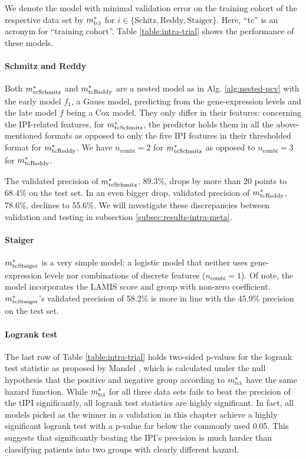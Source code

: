 We denote the model with minimal validation error on the training cohort of the respective data set 
by $m^*_\text{tci}$ for $i \in \{\text{Schitz}, \text{Reddy}, \text{Staiger}\}$.  Here, ``tc'' is an 
acronym for ``training cohort''. Table \ref{table:intra-trial} shows the performance of these models.

\paragraph{Schmitz and Reddy}
Both $m^*_\text{tcSchmitz}$ and $m^*_\text{tcReddy}$ are a nested 
model as in Alg. \ref{alg:nested-pcv} with the early model $f_1$, a Gauss model, predicting from 
the gene-expression levels and the late model $f$ being a Cox model. They only differ in their 
features: concerning the IPI-related features, for $m^*_\text{tcSchmitz}$, the predictor holds them in
all the above-mentioned formats as opposed to only the five IPI features in their thresholded 
format for 
$m^*_\text{tcReddy}$. We have $n_\text{combi} = 2$ for $m^*_\text{tcSchmitz}$ as opposed to $n_\text{combi} = 3$ 
for $m^*_\text{tcReddy}$.

The validated precision of $m^*_\text{tcSchmitz}$, \num{89.3}\%, drops by more than \num{20} points 
to \num{68.4}\% on the test set. In an even bigger drop, validated precision of $m^*_\text{tcReddy}$,
\num{78.6}\%, declines to \num{55.6}\%. We will investigate these discrepancies between 
validation and testing in subsection \ref{subsec:results-intra-meta}.

\paragraph{Staiger}
$m^*_\text{tcStaiger}$ is a very simple model: a logistic model that neither uses 
gene-expression levels nor combinations of discrete features ($n_\text{combi} = 1$). Of note, the 
model incorporates the LAMIS score and group with non-zero coefficient. $m^*_\text{tcStaiger}$'s 
validated precision of \num{58.2}\% is more in line with the \num{45.9}\% precision on the test set.

\paragraph{Logrank test}
The last row of Table \ref{table:intra-trial} holds two-sided p-values for the logrank test
statistic as proposed by Mandel \cite{mantel66}, which is calculated under the null hypothesis 
that the positive and negative group according to $m^*_\text{tci}$ have the same hazard function. While 
$m^*_\text{tci}$ for all three data sets fails to beat the precision of the tIPI significantly, all logrank 
test statistics are highly significant. In fact, all models picked as the winner in a validation in this 
chapter achieve a highly significant logrank test with a p-value far below the commonly used \num{0.05}. 
This suggests that significantly beating the IPI's precision is much harder than classifying patients 
into two groups with clearly different hazard. 

